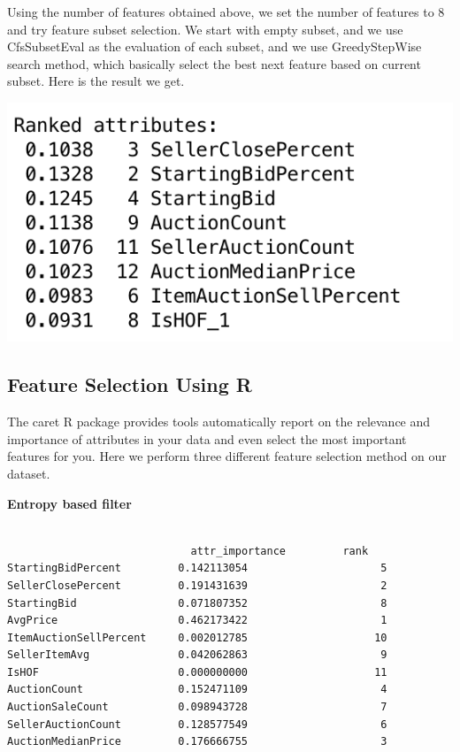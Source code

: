 \documentclass[CEJM,PDF]{cej} %
\begin{document}
Using the number of features obtained above, we set the number of features to 8 and try feature subset selection. We start with empty subset, and we use CfsSubsetEval as the evaluation of each subset, and we use GreedyStepWise search method, which basically select the best next feature based on current subset. Here is the result we get.

{\centering
    \vspace{3 mm}
    \includegraphics[scale=0.6]{weka-FilteredSubsetWithGreedyStepwise.png}
    \par
}



\subsection{Feature Selection Using R}
The caret R package provides tools automatically report on the relevance and importance of attributes in your data and even select the most important features for you. Here we perform three different feature selection method on our dataset.

\textbf{Entropy based filter}
\begin{verbatim}

                    		 attr_importance 		 rank
StartingBidPercent         0.142113054                     5
SellerClosePercent         0.191431639                     2
StartingBid                0.071807352                     8
AvgPrice                   0.462173422                     1
ItemAuctionSellPercent     0.002012785                    10
SellerItemAvg              0.042062863                     9
IsHOF                      0.000000000                    11
AuctionCount               0.152471109                     4
AuctionSaleCount           0.098943728                     7
SellerAuctionCount         0.128577549                     6
AuctionMedianPrice         0.176666755                     3
\end{verbatim}
\end{document}
